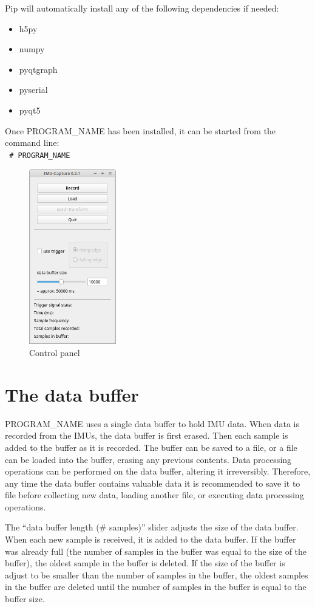 \documentclass[11pt,letterpaper,article,oneside]{memoir}
\newcommand{\name}{PROGRAM\_NAME}
\begin{document}
Pip will automatically install any of the following dependencies if needed:
\begin{itemize}
\item h5py
\item numpy
\item pyqtgraph
\item pyserial
\item pyqt5
\end{itemize}

Once \name{} has been installed, it can be started from the command line:\\
\texttt{
\# \name{}
}

\begin{figure}[]
    \begin{center}
        \includegraphics[height=3in]{screenshot_panel}
    \end{center}
    \caption{Control panel} 
\end{figure}


\chapter{The data buffer}
\name{} uses a single data buffer to hold IMU data. When data is recorded from
the IMUs, the data buffer is first erased. Then each sample is added to the
buffer as it is recorded. The buffer can be saved to a file, or a file can be
loaded into the buffer, erasing any previous contents. Data processing
operations can be performed on the data buffer, altering it irreversibly.
Therefore, any time the data buffer contains valuable data it is recommended to
save it to file before collecting new data, loading another file, or executing
data processing operations.

The ``data buffer length (\# samples)'' slider adjusts the size of the data
buffer. When each new sample is received, it is added to the data buffer. If the
buffer was already full (the number of samples in the buffer was equal to the
size of the buffer), the oldest sample in the buffer is deleted. If the size of
the buffer is adjust to be smaller than the number of samples in the buffer, the
oldest samples in the buffer are deleted until the number of samples in the
buffer is equal to the buffer size.
\end{document}
